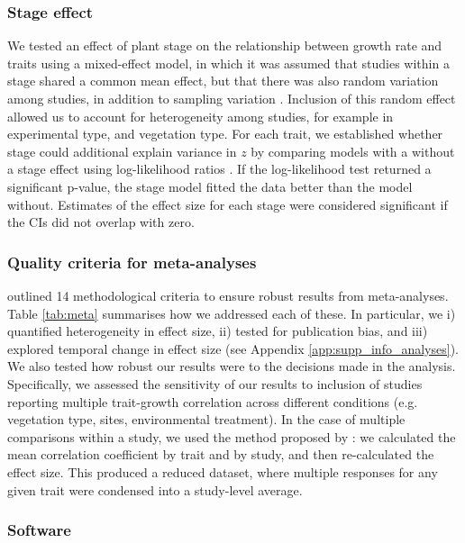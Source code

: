 \documentclass[a4paper,11pt]{article}
\begin{document}
\subsubsection*{Stage effect}\label{stage-effect}

We tested an effect of plant stage on the relationship between growth rate and traits using a mixed-effect model, in which it was assumed that studies within a stage shared a common mean effect, but that there was also random variation among studies, in addition to sampling variation \citep{Zuur:2009cfa}. Inclusion of this random effect allowed us to account for heterogeneity among studies, for example in experimental type, and vegetation type. For each trait, we established whether stage could additional explain variance in $z$ by comparing models with a without a stage effect  using log-likelihood ratios \citep{Zuur:2009cfa}. If the log-likelihood test returned a significant p-value, the stage model fitted the data better than the model without. Estimates of the effect size for each stage were considered significant if the CIs did not overlap with zero.

\subsubsection*{Quality criteria for meta-analyses}

\citet{Koricheva:2014ku} outlined 14 methodological criteria to ensure robust results from meta-analyses. Table \ref{tab:meta} summarises how we addressed each of these. In particular, we i) quantified heterogeneity in effect size, ii) tested for publication bias, and iii) explored temporal change in effect size (see Appendix \ref{app:supp_info_analyses}).
We also tested how robust our results were to the decisions made in the analysis. Specifically, we assessed the sensitivity of our results to inclusion of studies reporting multiple trait-growth correlation across different conditions (e.g. vegetation type, sites, environmental treatment). In the case of multiple comparisons within a study, we used the method proposed by \citet{Borenstein:2009um}: we calculated the mean correlation coefficient by trait and by study, and then re-calculated the effect size. This produced a reduced dataset, where multiple responses for any given trait were condensed into a study-level average.

\subsubsection*{Software}
\end{document}
